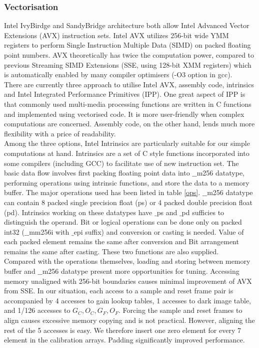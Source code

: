 \documentclass[journal]{IEEEtran}
\begin{document}
\subsubsection{Vectorisation}
\label{Vec}
Intel IvyBirdge and SandyBridge architecture both allow Intel Advanced Vector Extensions (AVX) instruction sets. Intel AVX utilizes 256-bit wide YMM registers to perform Single Instruction Multiple Data (SIMD) on packed floating point numbers. AVX theoretically has twice the computation power, compared to previous Streaming SIMD Extensions (SSE, using 128-bit XMM registers) which is automatically enabled by many compiler optimisers (-O3 option in gcc). \\
There are currently three approach to utilise Intel AVX, assembly code, intrinsics and Intel Integrated Performance Primitives (IPP). One great aspect of IPP is that commonly used multi-media processing functions are written in C functions and implemented using vectorised code. It is more user-friendly when complex computations are concerned. Assembly code, on the other hand, lends much more flexibility with a price of readability. \\

Among the three options, Intel Intrinsics are particularly suitable for our simple computations at hand. Intrinsics are a set of C style functions incorporated into some compilers (including GCC) to facilitate use of new instruction set. The basic data flow involves first packing floating point data into $\_\_$m256 datatype, performing operations using intrinsic functions, and store the data to a memory buffer. The major operations used has been listed in table \ref{ops}. $\_\_$m256 datatype can contain 8 packed single precision float (ps) or 4 packed double precision float (pd). Intrinsics working on these datatypes have $\_$ps and $\_$pd sufficies to distinguish the operand. Bit or logical operations can be done only on packed int32 ($\_\_$mm256i with $\_$epi suffix) and conversion or casting is needed. Value of each packed element remains the same after conversion and Bit arrangement remains the same after casting. These two functions are also supplied. \\

Compared with the operations themselves, loading and storing between memory buffer and $\_\_$m256 datatype present more opportunities for tuning. Accessing memory unaligned with 256-bit boundaries causes minimal improvement of AVX from SSE. In our situation, each access to a sample and reset frame pair is accompanied by 4 accesses to gain lookup tables, 1 accesses to dark image table, and 1/126 accesses to $G_C, O_C, G_F, O_F$. Forcing the sample and reset frames to align causes excessive memory copying and is not practical. However, aligning the rest of the 5 accesses is easy. We therefore insert one zero element for every 7 element in the calibration arrays. Padding significantly improved performance. \\
\end{document}
